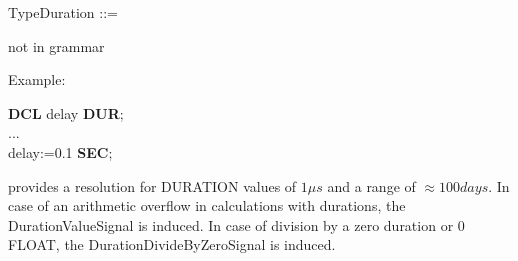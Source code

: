 \begin{front}
TypeDuration ::=\\
\end{front}
\begin{grammar}
not in grammar
\end{grammar}

Example:

{\bf DCL} delay {\bf DUR};\\
...\\
delay:=0.1 {\bf SEC};

\begin{added}
\OpenPEARL{} provides a resolution for DURATION values of $1\mu s$ and
a range of $\approx 100 days$.
In case of an arithmetic overflow in calculations with durations, the
DurationValueSignal is induced.
In case of division by a zero duration or 0 FLOAT, 
the DurationDivideByZeroSignal is induced.
\end{added}

